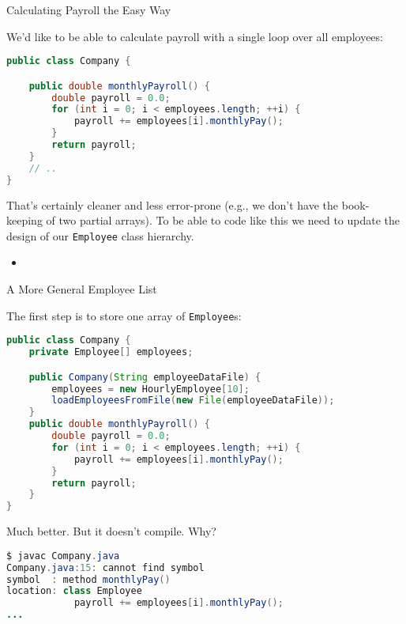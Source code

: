 \documentclass{beamer}
\begin{document}
\begin{frame}[fragile]{Calculating Payroll the Easy Way}


We'd like to be able to calculate payroll with a single loop over all employees:
\begin{lstlisting}[language=Java]
public class Company {

    public double monthlyPayroll() {
        double payroll = 0.0;
        for (int i = 0; i < employees.length; ++i) {
            payroll += employees[i].monthlyPay();
        }
        return payroll;
    }
    // ..
}
\end{lstlisting}

That's certainly cleaner and less error-prone (e.g., we don't have the book-keeping of two partial arrays).  To be able to code like this we need to update the design of our {\tt Employee} class hierarchy.
\begin{itemize}
\item
\end{itemize}


\end{frame}

\begin{frame}[fragile]{A More General Employee List}


The first step is to store one array of {\tt Employee}s:
\vspace{-.05in}
\begin{lstlisting}[language=Java]
public class Company {
    private Employee[] employees;

    public Company(String employeeDataFile) {
        employees = new HourlyEmployee[10];
        loadEmployeesFromFile(new File(employeeDataFile));
    }
    public double monthlyPayroll() {
        double payroll = 0.0;
        for (int i = 0; i < employees.length; ++i) {
            payroll += employees[i].monthlyPay();
        }
        return payroll;
    }
}
\end{lstlisting}
\vspace{-.05in}
Much better.  But it doesn't compile.  Why?
\vspace{-.05in}
\begin{lstlisting}[language=Java]
$ javac Company.java
Company.java:15: cannot find symbol
symbol  : method monthlyPay()
location: class Employee
            payroll += employees[i].monthlyPay();
...
\end{lstlisting}

\end{frame}
\end{document}
